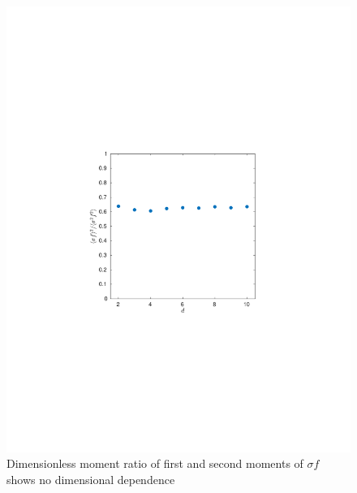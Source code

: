 \begin{figure}[h!]
  \includegraphics[width=\columnwidth, trim=133 242 168 254, clip]{excessContactsScaling/mfr.pdf}
     \caption{Dimensionless moment ratio of first and second moments of $\sigma f$ shows no dimensional dependence}
     \label{plot:mfr}
\end{figure}
